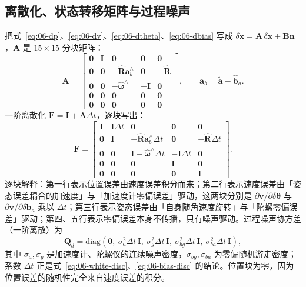 \subsection{离散化、状态转移矩阵与过程噪声}

把式~\eqref{eq:06-dp}、\eqref{eq:06-dv}、\eqref{eq:06-dtheta}、\eqref{eq:06-dbias} 写成 $\delta\dot{\bm{x}}=\bm{A}\,\delta\bm{x}+\bm{B}\bm{n}$，$\bm{A}$ 是 $15\times15$ 分块矩阵：
\begin{equation}
  \bm{A} = \begin{bmatrix}
    \bm{0} & \bm{I} & \bm{0} & \bm{0} & \bm{0}\\
    \bm{0} & \bm{0} & -\hat{\bm{R}}\bm{a}_b^{\wedge} & \bm{0} & -\hat{\bm{R}}\\
    \bm{0} & \bm{0} & -\hat{\bm{\omega}}^{\wedge} & -\bm{I} & \bm{0}\\
    \bm{0} & \bm{0} & \bm{0} & \bm{0} & \bm{0}\\
    \bm{0} & \bm{0} & \bm{0} & \bm{0} & \bm{0}
  \end{bmatrix},
  \qquad \bm{a}_b=\tilde{\bm{a}}-\hat{\bm{b}}_a.
  \label{eq:06-A}
\end{equation}
一阶离散化 $\bm{F}=\bm{I}+\bm{A}\Delta t$，逐块写出：
\begin{equation}
  \bm{F} = \begin{bmatrix}
    \bm{I} & \bm{I}\Delta t & \bm{0} & \bm{0} & \bm{0}\\
    \bm{0} & \bm{I} & -\hat{\bm{R}}\bm{a}_b^{\wedge}\Delta t & \bm{0} & -\hat{\bm{R}}\Delta t\\
    \bm{0} & \bm{0} & \bm{I}-\hat{\bm{\omega}}^{\wedge}\Delta t & -\bm{I}\Delta t & \bm{0}\\
    \bm{0} & \bm{0} & \bm{0} & \bm{I} & \bm{0}\\
    \bm{0} & \bm{0} & \bm{0} & \bm{0} & \bm{I}
  \end{bmatrix}.
  \label{eq:06-F}
\end{equation}
逐块解释：第一行表示位置误差由速度误差积分而来；第二行表示速度误差由「姿态误差耦合的加速度」与「加速度计零偏误差」驱动，这两块分别是 $\partial\dot{\bm{v}}/\partial\delta\bm{\theta}$ 与 $\partial\dot{\bm{v}}/\partial\delta\bm{b}_a$ 乘以 $\Delta t$；第三行表示姿态误差由「自身随角速度旋转」与「陀螺零偏误差」驱动；第四、五行表示零偏误差本身不传播，只有噪声驱动。过程噪声协方差（一阶离散）为
\begin{equation}
  \bm{Q}_d = \mathrm{diag}\left(\bm{0},\ \sigma_{a}^{2}\Delta t\,\bm{I},\ \sigma_{g}^{2}\Delta t\,\bm{I},\ \sigma_{bg}^{2}\Delta t\,\bm{I},\ \sigma_{ba}^{2}\Delta t\,\bm{I}\right),
  \label{eq:06-Qd}
\end{equation}
其中 $\sigma_a,\sigma_g$ 是加速度计、陀螺仪的连续噪声密度，$\sigma_{bg},\sigma_{ba}$ 为零偏随机游走密度；系数 $\Delta t$ 正是式~\eqref{eq:06-white-disc}、\eqref{eq:06-bias-disc} 的结论。位置块为零，因为位置误差的随机性完全来自速度误差的积分。

